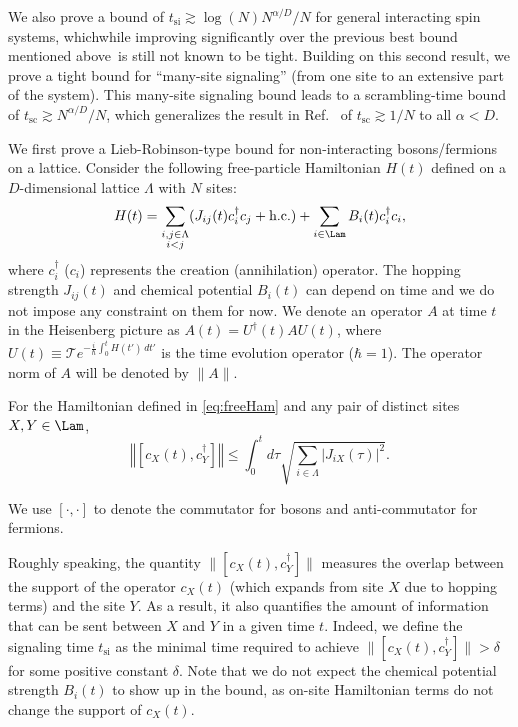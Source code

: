 We also prove a bound of $t_{\text{si}}\gtrsim \log(N)N^{\alpha/D}/N$ for general interacting spin systems, which\dash while improving significantly over the previous best bound mentioned above~\cite{Storch15}\dash is still not known to be tight.
Building on this second result, we prove a tight bound for ``many-site signaling'' (from one site to an extensive part of the system).
This many-site signaling bound leads to a scrambling-time bound of $t_\text{sc}\gtrsim N^{\alpha/D}/N$, which generalizes the result in Ref.~\cite{Lashkari13} of $t_\text{sc} \gtrsim 1/N$ to all $\alpha<D$.

We first prove a Lieb-Robinson-type bound for non-interacting bosons/fermions on a lattice. Consider the following free-particle Hamiltonian $H(t)$ defined on a $D$-dimensional lattice $\Lambda$ with $N$ sites:
 \begin{equation}
    \label{eq:freeHam}
 	H(t) = \sum_{\substack{i,j\in\Lambda \\ i< j}} (J_{ij}(t) c_i^\dagger c_j + \text{h.c.}) + \sum_{i\in\Lam}B_{i}(t)c_i^\dagger c_i,
    \end{equation}
where $c_i^\dagger$ ($c_i$) represents the creation (annihilation) operator. The hopping strength $J_{ij}(t)$ and chemical potential $B_i(t)$ can depend on time and we do not impose any constraint on them for now. We denote an operator $A$ at time $t$ in the Heisenberg picture as $A(t)=U^\dagger(t)A U(t)$, where $U(t) \equiv \mathcal{T} e^{-\frac i \hbar \int_0^t H(t')\,dt'}$ is the time evolution operator ($\hbar = 1$). The operator norm of $A$ will be denoted by $\|A\|$.
\begin{theorem}
    \label{eq:tightbound}
For the Hamiltonian defined in \cref{eq:freeHam} and any pair of distinct sites $X, Y \in \Lam$,
\begin{equation}
    \label{eq:tightboundeq}
    \left\Vert \left[c_{X}(t),c_{Y}^{\dagger}\right]\right\Vert \le  \int_{0}^{t}d\tau\sqrt{\sum_{i\in\Lambda}\left|J_{iX}(\tau)\right|^{2}}.
\end{equation}
\end{theorem}
We use $[\cdot,\cdot]$ to denote the commutator for bosons and anti-commutator for fermions.

Roughly speaking, the quantity $\|[c_{X}(t),c_{Y}^{\dagger}]\|$ measures the overlap between the support of the operator $c_{X}(t)$ (which expands from site $X$ due to hopping terms) and the site $Y$.
As a result, it also quantifies the amount of information that can be sent between $X$ and $Y$ in a given time $t$.
Indeed, we define the signaling time $t_\text{si}$ as the minimal time required to achieve $\|[c_{X}(t),c_{Y}^{\dagger}]\| > \delta$ for some positive constant $\delta$.
Note that we do not expect the chemical potential strength $B_i(t)$ to show up in the bound, as on-site Hamiltonian terms do not change the support of $c_X(t)$.

